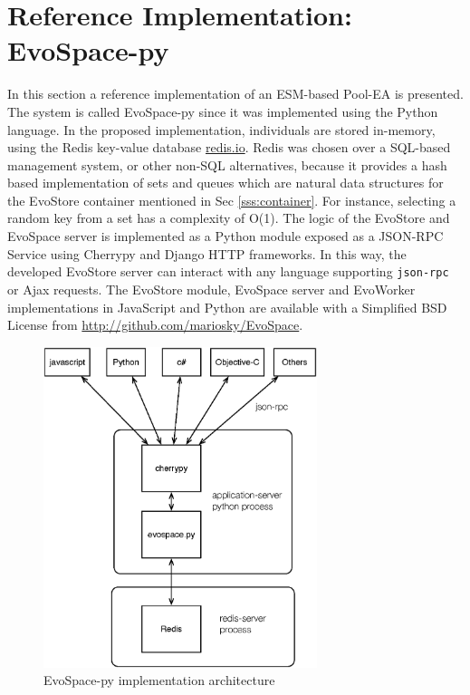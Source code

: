 \section{Reference Implementation: EvoSpace-py}
\label{sec:ref}
In this section a reference implementation of an ESM-based Pool-EA is presented.
The system is called EvoSpace-py since it was implemented using the Python language. 
In the proposed implementation, individuals are stored in-memory, using the Redis key-value database \url{redis.io}. 
Redis was chosen over a SQL-based management system, or other non-SQL
alternatives, because it provides a hash based implementation of sets
and queues which are natural data structures for the EvoStore container mentioned in Sec \ref{sss:container}. For instance, selecting a random key from a set has a complexity
of O(1). The logic of the EvoStore and EvoSpace server is implemented as a Python module exposed as a JSON-RPC Service using Cherrypy and Django HTTP frameworks.
In this way, the developed EvoStore server %
can interact with any language supporting {\tt json-rpc} or Ajax requests. The EvoStore module, EvoSpace server and EvoWorker implementations in JavaScript and Python are available with a Simplified BSD License from \url{http://github.com/mariosky/EvoSpace}.

\begin{figure}[t]
    \centering
        \includegraphics[width=8cm]{evospace.eps}
    \caption{EvoSpace-py implementation architecture } %
    \label{fig:evospace}
\end{figure}

